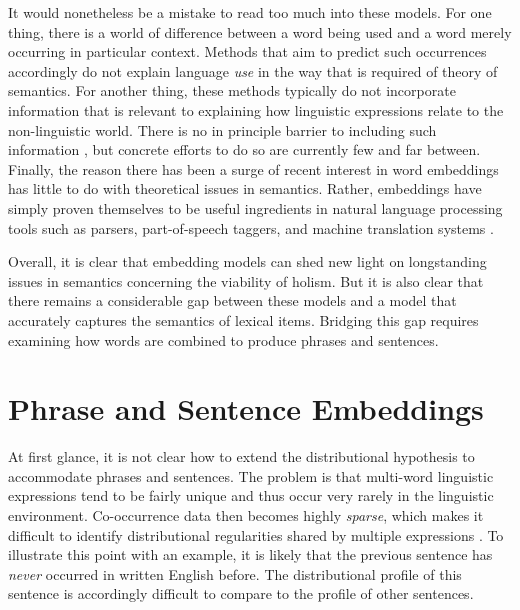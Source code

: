 It would nonetheless be a mistake to read too much into these models. For one thing, there is a world of difference between a word being used and a word merely occurring in particular context. Methods that aim to predict such occurrences accordingly do not explain language \textit{use} in the way that is required of theory of semantics. For another thing, these methods typically do not incorporate information that is relevant to explaining how linguistic expressions relate to the non-linguistic world. There is no in principle barrier to including such information \citep{Baroni:2014,LandauerDumais:1997}, but concrete efforts to do so are currently few and far between. Finally, the reason there has been a surge of recent interest in word embeddings has little to do with theoretical issues in semantics. Rather, embeddings have simply proven themselves to be useful ingredients in natural language processing tools such as parsers, part-of-speech taggers, and machine translation systems \citep{Manning:2015}. 

Overall, it is clear that embedding models can shed new light on longstanding issues in semantics concerning the viability of holism. But it is also clear that there remains a considerable gap between these models and a model that accurately captures the semantics of lexical items. Bridging this gap requires examining how words are combined to produce phrases and sentences.

\section{Phrase and Sentence Embeddings}

At first glance, it is not clear how to extend the distributional hypothesis to accommodate phrases and sentences. The problem is that multi-word linguistic expressions tend to be fairly unique and thus occur very rarely in the linguistic environment. Co-occurrence data then becomes highly \textit{sparse}, which makes it difficult to identify distributional regularities shared by multiple expressions \citep{Baroni:2014}. To illustrate this point with an example, it is likely that the previous sentence has \textit{never} occurred in written English before. The distributional profile of this sentence is accordingly difficult to compare to the profile of other sentences. 

